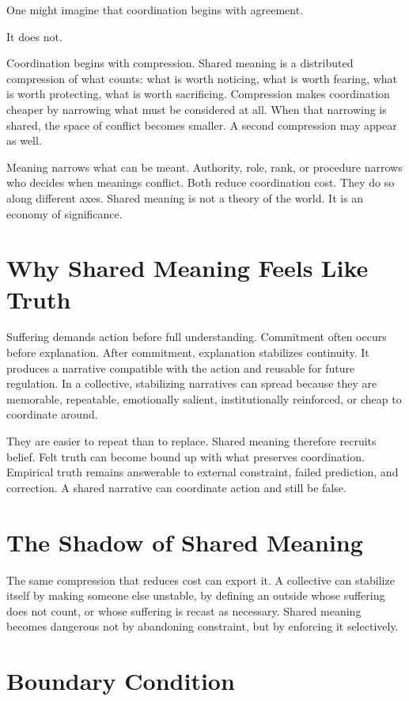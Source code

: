 \documentclass[11pt,twoside,openright]{book}
\begin{document}
One might imagine that coordination begins with agreement.

It does not.

Coordination begins with compression. Shared meaning is a distributed compression of what counts: what is worth noticing, what is worth fearing, what is worth protecting, what is worth sacrificing. Compression makes coordination cheaper by narrowing what must be considered at all. When that narrowing is shared, the space of conflict becomes smaller. A second compression may appear as well.

Meaning narrows what can be meant. Authority, role, rank, or procedure narrows who decides when meanings conflict. Both reduce coordination cost. They do so along different axes. Shared meaning is not a theory of the world. It is an economy of significance.

\section*{Why Shared Meaning Feels Like Truth}

Suffering demands action before full understanding. Commitment often occurs before explanation. After commitment, explanation stabilizes continuity. It produces a narrative compatible with the action and reusable for future regulation. In a collective, stabilizing narratives can spread because they are memorable, repeatable, emotionally salient, institutionally reinforced, or cheap to coordinate around.

They are easier to repeat than to replace. Shared meaning therefore recruits belief. Felt truth can become bound up with what preserves coordination. Empirical truth remains answerable to external constraint, failed prediction, and correction. A shared narrative can coordinate action and still be false.

\section*{The Shadow of Shared Meaning}

The same compression that reduces cost can export it. A collective can stabilize itself by making someone else unstable, by defining an outside whose suffering does not count, or whose suffering is recast as necessary. Shared meaning becomes dangerous not by abandoning constraint, but by enforcing it selectively.

\section*{Boundary Condition}
\end{document}
